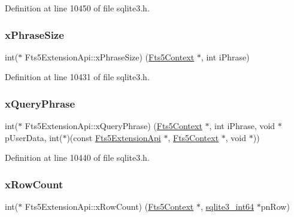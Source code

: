 Definition at line 10450 of file sqlite3.\+h.

\mbox{\label{struct_fts5_extension_api_aeda6faa66f47f9116c9ceba882aaedd2}} 
\subsubsection{\texorpdfstring{x\+Phrase\+Size}{xPhraseSize}}
{\footnotesize\ttfamily int($\ast$ Fts5\+Extension\+Api\+::x\+Phrase\+Size) (\mbox{\hyperlink{sqlite3_8h_a97821b95ebebd43db901977ffd5b26bc}{Fts5\+Context}} $\ast$, int i\+Phrase)}



Definition at line 10431 of file sqlite3.\+h.

\mbox{\label{struct_fts5_extension_api_a8f6dcf0a1d246b235f98f5bbb214e28d}} 
\subsubsection{\texorpdfstring{x\+Query\+Phrase}{xQueryPhrase}}
{\footnotesize\ttfamily int($\ast$ Fts5\+Extension\+Api\+::x\+Query\+Phrase) (\mbox{\hyperlink{sqlite3_8h_a97821b95ebebd43db901977ffd5b26bc}{Fts5\+Context}} $\ast$, int i\+Phrase, void $\ast$p\+User\+Data, int($\ast$)(const \mbox{\hyperlink{struct_fts5_extension_api}{Fts5\+Extension\+Api}} $\ast$, \mbox{\hyperlink{sqlite3_8h_a97821b95ebebd43db901977ffd5b26bc}{Fts5\+Context}} $\ast$, void $\ast$))}



Definition at line 10440 of file sqlite3.\+h.

\mbox{\label{struct_fts5_extension_api_ae1eb7ad1d3c131a09376134ecc099568}} 
\subsubsection{\texorpdfstring{x\+Row\+Count}{xRowCount}}
{\footnotesize\ttfamily int($\ast$ Fts5\+Extension\+Api\+::x\+Row\+Count) (\mbox{\hyperlink{sqlite3_8h_a97821b95ebebd43db901977ffd5b26bc}{Fts5\+Context}} $\ast$, \mbox{\hyperlink{sqlite3_8h_a0a4d3e6c1ad46f90e746b920ab6ca0d2}{sqlite3\+\_\+int64}} $\ast$pn\+Row)}



